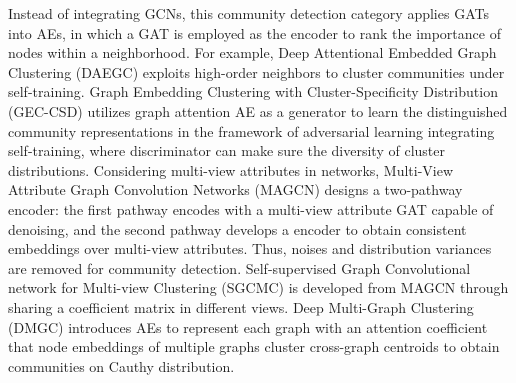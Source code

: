 \label{sec-gat-ae}
Instead of integrating GCNs, this community detection category applies GATs into AEs, in which a GAT is employed as the encoder to rank the importance of nodes within a neighborhood. For example, Deep Attentional Embedded Graph Clustering (DAEGC)  exploits high-order neighbors to cluster communities under self-training. Graph Embedding Clustering with Cluster-Specificity Distribution (GEC-CSD)  utilizes graph attention AE as a generator to learn the distinguished community representations in the framework of adversarial learning integrating self-training, where discriminator can make sure the diversity of cluster distributions.
Considering multi-view attributes in networks, Multi-View Attribute Graph Convolution Networks (MAGCN)  designs a two-pathway encoder: the first pathway encodes with a multi-view attribute GAT capable of denoising, and the second pathway develops a encoder to obtain consistent embeddings over multi-view attributes. Thus, noises and distribution variances are removed for community detection. Self-supervised Graph Convolutional network for Multi-view Clustering (SGCMC)  is developed from MAGCN through sharing a coefficient matrix in different views. 
Deep Multi-Graph Clustering (DMGC)  introduces AEs to represent each graph with an attention coefficient that node embeddings of multiple graphs cluster cross-graph centroids to obtain communities on Cauthy distribution.

